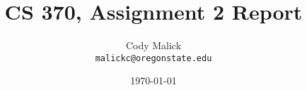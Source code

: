 \documentclass[10pt,letterpaper]{article}
\begin{document}
  \title{CS 370, Assignment 2 Report}
  \author{Cody Malick\\
  \texttt{malickc@oregonstate.edu}}
  \date{\today}
  \maketitle
  \section{}
\end{document}
